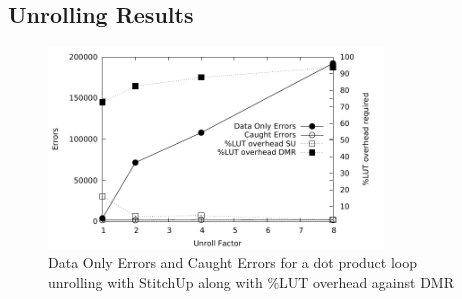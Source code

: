 \subsection{Unrolling Results}
\begin{figure}[h]
\centering
\includegraphics[width=3.5in]{./graphs/dp_unrolling_res.pdf}
\caption{Data Only Errors and Caught Errors for a dot product loop unrolling with StitchUp along with \%LUT overhead against DMR}
\label{fig:dp_unrolling_res}
\end{figure}


